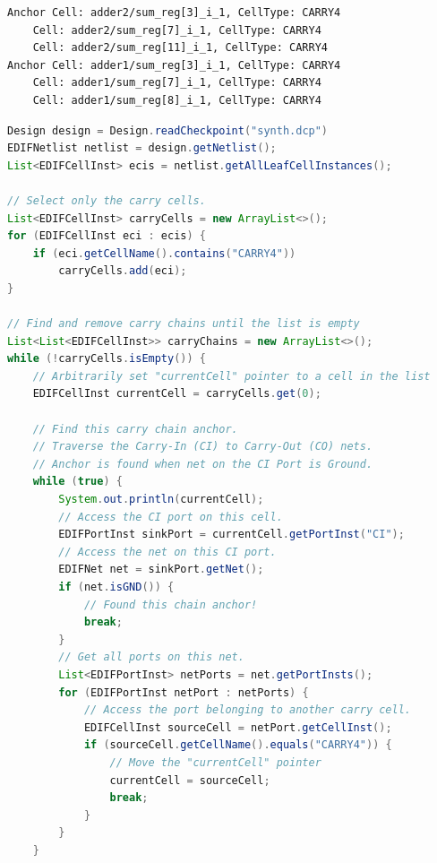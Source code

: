 \begin{multicols}{2}


\begin{lstlisting}[caption={Code Printout}]
Anchor Cell: adder2/sum_reg[3]_i_1, CellType: CARRY4
	Cell: adder2/sum_reg[7]_i_1, CellType: CARRY4
	Cell: adder2/sum_reg[11]_i_1, CellType: CARRY4
Anchor Cell: adder1/sum_reg[3]_i_1, CellType: CARRY4
	Cell: adder1/sum_reg[7]_i_1, CellType: CARRY4
	Cell: adder1/sum_reg[8]_i_1, CellType: CARRY4
\end{lstlisting}


\begin{lstlisting}[language=java, caption={Finding and storing carry chains.}, label={lst:carry_chains}]
Design design = Design.readCheckpoint("synth.dcp")
EDIFNetlist netlist = design.getNetlist();
List<EDIFCellInst> ecis = netlist.getAllLeafCellInstances();

// Select only the carry cells.
List<EDIFCellInst> carryCells = new ArrayList<>();
for (EDIFCellInst eci : ecis) {
    if (eci.getCellName().contains("CARRY4"))
        carryCells.add(eci);
}

// Find and remove carry chains until the list is empty
List<List<EDIFCellInst>> carryChains = new ArrayList<>();
while (!carryCells.isEmpty()) {
    // Arbitrarily set "currentCell" pointer to a cell in the list
    EDIFCellInst currentCell = carryCells.get(0);

    // Find this carry chain anchor.
    // Traverse the Carry-In (CI) to Carry-Out (CO) nets.
    // Anchor is found when net on the CI Port is Ground.
    while (true) {
        System.out.println(currentCell);
        // Access the CI port on this cell.
        EDIFPortInst sinkPort = currentCell.getPortInst("CI");
        // Access the net on this CI port.
        EDIFNet net = sinkPort.getNet();
        if (net.isGND()) {
            // Found this chain anchor!
            break;
        }
        // Get all ports on this net.
        List<EDIFPortInst> netPorts = net.getPortInsts();
        for (EDIFPortInst netPort : netPorts) {
            // Access the port belonging to another carry cell.
            EDIFCellInst sourceCell = netPort.getCellInst();
            if (sourceCell.getCellName().equals("CARRY4")) {
                // Move the "currentCell" pointer
                currentCell = sourceCell;
                break;
            }
        }
    }




\end{lstlisting}
\end{multicols}
